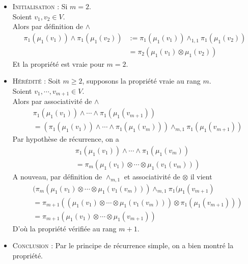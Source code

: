 \documentclass[../geometrie.tex]{subfiles}
\begin{document}
{{			\begin{itemize}
				\item[$\bullet$] \textsc{Initialisation} : Si $m = 2$. \\
					Soient $v_{1}, v_{2} \in V$. \\
					Alors par définition de $\wedge$
					$$
						\begin{aligned}
							\pi_{1}(\mu_{1}(v_{1})) \wedge \pi_{1}(\mu_{1}(v_{2})) & := \pi_{1}(\mu_{1}(v_{1})) \wedge_{1, 1} \pi_{1}(\mu_{1}(v_{2})) \\
							& = \pi_{2}(\mu_{1}(v_{1}) \otimes \mu_{1}(v_{2}))
						\end{aligned}
					$$
					Et la propriété est vraie pour $m = 2$.
				\item[$\bullet$] \textsc{Hérédité} : Soit $m \geq 2$, supposons la propriété vraie au rang $m$. \\
					Soient $v_{1}, \cdots, v_{m+1} \in V$. \\
					Alors par associativité de $\wedge$
					$$
						\begin{aligned}
							& \pi_{1}(\mu_{1}(v_{1})) \wedge \cdots \wedge \pi_{1}(\mu_{1}(v_{m+1})) \\
							& = (\pi_{1}(\mu_{1}(v_{1})) \wedge \cdots \wedge \pi_{1}(\mu_{1}(v_{m}))) \wedge_{m, 1} \pi_{1}(\mu_{1}(v_{m+1}))
						\end{aligned}
					$$
					Par hypothèse de récurrence, on a
					$$
						\begin{aligned}
							& \pi_{1}(\mu_{1}(v_{1})) \wedge \cdots \wedge \pi_{1}(\mu_{1}(v_{m})) \\
							& = \pi_{m}(\mu_{1}(v_{1}) \otimes \cdots \otimes \mu_{1}(v_{1}(v_{m})))
						\end{aligned}
					$$
					A nouveau, par définition de $\wedge_{m, 1}$ et associativité de $\otimes$ il vient
					$$
						\begin{aligned}
							& (\pi_{m}(\mu_{1}(v_{1}) \otimes \cdots \otimes \mu_{1}(v_{1}(v_{m}))) \wedge_{m, 1} \pi_{1}(\mu_{1}(v_{m+1}) \\
							& = \pi_{m + 1}((\mu_{1}(v_{1}) \otimes \cdots \otimes \mu_{1}(v_{1}(v_{m}))) \otimes \pi_{1}(\mu_{1}(v_{m+1}))) \\
							& = \pi_{m + 1}(\mu_{1}(v_{1}) \otimes \cdots \otimes \mu_{1}(v_{m+1}))
						\end{aligned}
					$$
					D'où la propriété vérifiée au rang $m+1$.
				\item[$\bullet$] \textsc{Conclusion} : Par le principe de récurrence simple, on a bien montré la propriété.
			\end{itemize}
		}

}
\end{document}
